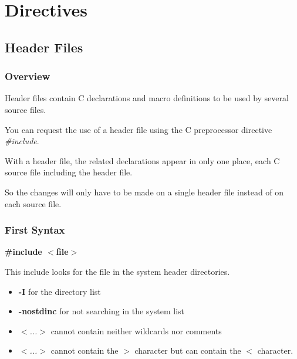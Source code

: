 \documentclass[8pt]{beamer}
\newcommand{\nl}[0]{\vspace{0.4cm}}
\begin{document}
%
%

\section{Directives}

%
%

\subsection{Header Files}


\begin{frame}
  \frametitle{Overview}

  Header files contain C declarations and macro definitions to be used
  by several source files.

  \nl

  You can request the use of a header file using the C preprocessor
  directive \textit{\#include}.

  \nl

  With a header file, the related declarations appear in only one place,
  each C source file including the header file.

  \nl

  So the changes will only have to be made on a single header file
  instead of on each source file.
\end{frame}


\begin{frame}[containsverbatim]
  \frametitle{First Syntax}

  \textbf{\#include $<$file$>$}

  \nl

  This include looks for the file in the system header directories.

  \begin{itemize}
  \item
    \textbf{-I} for the directory list
  \item
    \textbf{-nostdinc} for not searching in the system list
  \item
    \textit{$<$...$>$} cannot contain neither wildcards nor comments
  \item
    \textit{$<$...$>$} cannot contain the \textbf{$>$} character but
    can contain the \textbf{$<$} character.
  \end{itemize}
\end{frame}
\end{document}
